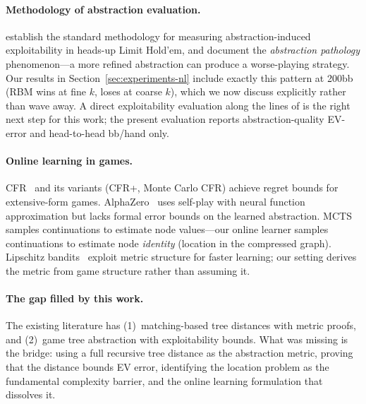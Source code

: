 \documentclass[11pt]{article}
\begin{document}
\paragraph{Methodology of abstraction evaluation.}
\citet{johanson2013evaluating} establish the standard methodology for
measuring abstraction-induced exploitability in heads-up Limit
Hold'em, and \citet{waugh2009abstraction} document the
\emph{abstraction pathology} phenomenon---a more refined abstraction
can produce a worse-playing strategy. Our results in
Section~\ref{sec:experiments-nl} include exactly this pattern at
200bb (RBM wins at fine $k$, loses at coarse $k$), which we now
discuss explicitly rather than wave away. A direct exploitability
evaluation along the lines of \citet{johanson2013evaluating} is the
right next step for this work; the present evaluation reports
abstraction-quality EV-error and head-to-head bb/hand only.

\paragraph{Online learning in games.}
CFR~\citep{zinkevich2007regret} and its variants (CFR+, Monte Carlo CFR)
achieve regret bounds for extensive-form games.
AlphaZero~\citep{silver2018general} uses self-play with neural function
approximation but lacks formal error bounds on the learned abstraction.
MCTS~\citep{coulom2006efficient,kocsis2006bandit} samples continuations
to estimate node values---our online learner samples continuations to
estimate node \emph{identity} (location in the compressed graph).
Lipschitz bandits~\citep{kleinberg2005nearly,bubeck2011lipschitz}
exploit metric structure for faster learning; our setting derives the
metric from game structure rather than assuming it.

\paragraph{The gap filled by this work.}
The existing literature has (1)~matching-based tree distances with
metric proofs, and (2)~game tree abstraction with exploitability bounds.
What was missing is the bridge: using a full recursive tree distance as
the abstraction metric, proving that the distance bounds EV error,
identifying the location problem as the fundamental complexity barrier,
and the online learning formulation that dissolves it.

\end{document}
